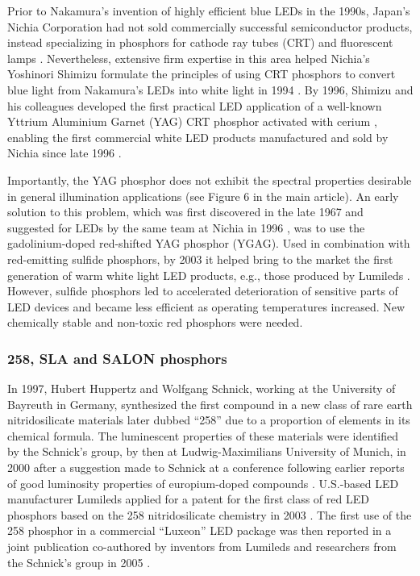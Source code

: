 \documentclass[parskip=full]{article}
\begin{document}
Prior to Nakamura’s invention of highly efficient blue LEDs in the 1990s, Japan’s Nichia Corporation had not sold commercially successful semiconductor products, instead specializing in phosphors for cathode ray tubes (CRT) and fluorescent lamps \cite{nakamura2013blue}  . Nevertheless, extensive firm expertise in this area helped Nichia’s Yoshinori Shimizu formulate the principles of using CRT phosphors to convert blue light from Nakamura’s LEDs into white light in 1994 \cite{shimizu1994sheet}\cite{cho2017white}. By 1996, Shimizu and his colleagues developed \cite{bando1996}\cite{shimizu1999light} the first practical LED application of a well-known Yttrium Aluminium Garnet (YAG) CRT phosphor activated with cerium \cite{blasse1967new}, enabling the first commercial white LED products manufactured and sold by Nichia since late 1996 \cite{bando1998development}\cite{cho2017white}. 

Importantly, the YAG phosphor does not exhibit the spectral properties desirable in general illumination applications (see Figure 6 in the main article). An early solution to this problem, which was first discovered in the late 1967 \cite{holloway1969optical} and suggested for LEDs by the same team at Nichia in 1996 \cite{bando1998development}\cite{shimizu1999light}, was to use the gadolinium-doped red-shifted YAG phosphor (YGAG). Used in combination with red-emitting sulfide phosphors, by 2003 it helped bring to the market the first generation of warm white light LED products, e.g., those produced by Lumileds \cite{Mueller2002}. However, sulfide phosphors led to accelerated deterioration of sensitive parts of LED devices and became less efficient as operating temperatures increased. New chemically stable and non-toxic red phosphors were needed. 

\subsubsection{258, SLA and SALON phosphors}

In 1997, Hubert Huppertz and Wolfgang Schnick, working at the University of Bayreuth in Germany, synthesized the first compound in a new class of rare earth nitridosilicate materials \cite{Huppertz1997} later dubbed “258” due to a proportion of elements in its chemical formula. The luminescent properties of these materials were identified by the Schnick’s group, by then at Ludwig-Maximilians University of Munich, in 2000 \cite{Hppe2000} after a suggestion made to Schnick at a conference following earlier reports of good luminosity properties of europium-doped compounds \cite{Qiua1998}. U.S.-based LED manufacturer Lumileds applied for a patent for the first class of red LED phosphors based on the 258 nitridosilicate chemistry in 2003 \cite{mueller2004phosphor}. The first use of the 258 phosphor in a commercial “Luxeon” LED package was then reported in a joint publication co-authored by inventors from Lumileds and researchers from the Schnick’s group in 2005 \cite{MuellerMach2005}.
\end{document}
